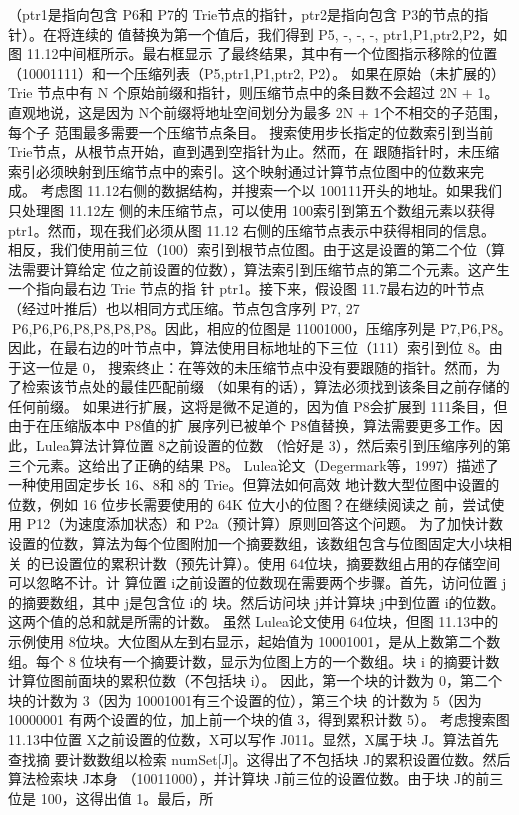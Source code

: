 （ptr1是指向包含 P6和 P7的 Trie节点的指针，ptr2是指向包含 P3的节点的指针）。在将连续的
值替换为第一个值后，我们得到 P5, -, -, -, ptr1,P1,ptr2,P2，如图 11.12中间框所示。最右框显示
了最终结果，其中有一个位图指示移除的位置（10001111）和一个压缩列表（P5,ptr1,P1,ptr2,
P2）。
如果在原始（未扩展的）Trie 节点中有 N 个原始前缀和指针，则压缩节点中的条目数不会超过
2N + 1。直观地说，这是因为 N个前缀将地址空间划分为最多 2N + 1个不相交的子范围，每个子
范围最多需要一个压缩节点条目。
搜索使用步长指定的位数索引到当前 Trie节点，从根节点开始，直到遇到空指针为止。然而，在
跟随指针时，未压缩索引必须映射到压缩节点中的索引。这个映射通过计算节点位图中的位数来完
成。
      考虑图 11.12右侧的数据结构，并搜索一个以 100111开头的地址。如果我们只处理图 11.12左
    侧的未压缩节点，可以使用 100索引到第五个数组元素以获得 ptr1。然而，现在我们必须从图
                                                             11.12
右侧的压缩节点表示中获得相同的信息。
相反，我们使用前三位（100）索引到根节点位图。由于这是设置的第二个位（算法需要计算给定
位之前设置的位数），算法索引到压缩节点的第二个元素。这产生一个指向最右边 Trie 节点的指
针 ptr1。接下来，假设图 11.7最右边的叶节点（经过叶推后）也以相同方式压缩。节点包含序列
P7,
                                                                27
P6,P6,P6,P8,P8,P8,P8。因此，相应的位图是 11001000，压缩序列是 P7,P6,P8。
因此，在最右边的叶节点中，算法使用目标地址的下三位（111）索引到位 8。由于这一位是 0，
搜索终止：在等效的未压缩节点中没有要跟随的指针。然而，为了检索该节点处的最佳匹配前缀
（如果有的话），算法必须找到该条目之前存储的任何前缀。
如果进行扩展，这将是微不足道的，因为值 P8会扩展到 111条目，但由于在压缩版本中 P8值的扩
展序列已被单个 P8值替换，算法需要更多工作。因此，Lulea算法计算位置 8之前设置的位数
（恰好是 3），然后索引到压缩序列的第三个元素。这给出了正确的结果 P8。
Lulea论文（Degermark等，1997）描述了一种使用固定步长 16、8和 8的 Trie。但算法如何高效
地计数大型位图中设置的位数，例如 16 位步长需要使用的 64K 位大小的位图？在继续阅读之
前，尝试使用 P12（为速度添加状态）和 P2a（预计算）原则回答这个问题。
为了加快计数设置的位数，算法为每个位图附加一个摘要数组，该数组包含与位图固定大小块相关
的已设置位的累积计数（预先计算）。使用 64位块，摘要数组占用的存储空间可以忽略不计。计
算位置 i之前设置的位数现在需要两个步骤。首先，访问位置 j的摘要数组，其中 j是包含位 i的
块。然后访问块 j并计算块 j中到位置 i的位数。这两个值的总和就是所需的计数。
虽然 Lulea论文使用 64位块，但图 11.13中的示例使用 8位块。大位图从左到右显示，起始值为
10001001，是从上数第二个数组。每个 8 位块有一个摘要计数，显示为位图上方的一个数组。块
i 的摘要计数计算位图前面块的累积位数（不包括块 i）。
因此，第一个块的计数为 0，第二个块的计数为 3（因为 10001001有三个设置的位），第三个块
的计数为 5（因为 10000001 有两个设置的位，加上前一个块的值 3，得到累积计数 5）。
考虑搜索图 11.13中位置 X之前设置的位数，X可以写作 J011。显然，X属于块 J。算法首先查找摘
要计数数组以检索 numSet[J]。这得出了不包括块 J的累积设置位数。然后算法检索块 J本身
（10011000），并计算块 J前三位的设置位数。由于块 J的前三位是 100，这得出值 1。最后，所



